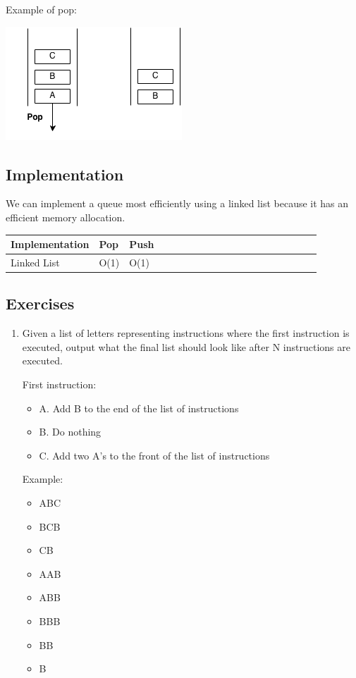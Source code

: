 \documentclass[11pt,oneside]{book}
\makeatletter
\def\maxwidth#1{\ifdim\Gin@nat@width>#1 #1\else\Gin@nat@width\fi}
\makeatother
\begin{document}
Example of pop:

\vspace{5px}\includegraphics[width=\maxwidth{\textwidth}]{queue2.png}

\subsection{Implementation}

We can implement a queue most efficiently using a linked list because it has an efficient memory allocation.

\vspace{10px}\begin{tabulary}{0.4\linewidth}{|l|l|l|l|l|l|l|l|l|l|l|l|l|l|l|l|l|l|l}\hline


  Implementation &
  Pop &
  Push\\
\hline


  Linked List &
  O(1) &
  O(1)\\

\hline\end{tabulary}

\subsection{Exercises}

\begin{enumerate}
\item Given a list of letters representing instructions where the first instruction is executed, output what the final list should look like after N instructions are executed.

First instruction:

\begin{itemize}
\item A. Add B to the end of the list of instructions
\item B. Do nothing
\item C. Add two A's to the front of the list of instructions
\end{itemize}

Example:

\begin{itemize}
\item ABC
\item BCB
\item CB
\item AAB
\item ABB
\item BBB
\item BB
\item B
\end{itemize}
\end{enumerate}
\end{document}
